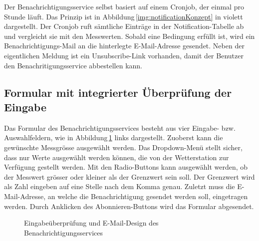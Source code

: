 \noindent
Der Benachrichtigungsservice selbst basiert auf einem Cronjob, der einmal pro Stunde läuft. Das Prinzip ist in Abbildung\,\ref{img:notificationKonzept} in violett dargestellt. Der Cronjob ruft sämtliche Einträge in der Notification-Tabelle ab und vergleicht sie mit den Messwerten. Sobald eine Bedingung erfüllt ist, wird ein Benachrichtigungs-Mail an die hinterlegte E-Mail-Adresse gesendet. Neben der eigentlichen Meldung ist ein Unsubscribe-Link vorhanden, damit der Benutzer den Benachritigungsservice abbestellen kann.

\subsection{Formular mit integrierter Überprüfung der Eingabe}
Das Formular des Benachrichtigungsservices besteht aus vier Eingabe- bzw. Auswahlfeldern, wie in Abbildung\,\ref{img:notificationFE} links dargestellt. Zuoberst kann die gewünschte Messgrösse ausgewählt werden. Das Dropdown-Menü stellt sicher, dass nur Werte ausgewählt werden können, die von der Wetterstation zur Verfügung gestellt werden. Mit den Radio-Buttons kann ausgewählt werden, ob der Messwert grösser oder kleiner als der Grenzwert sein soll. Der Grenzwert wird als Zahl eingeben auf eine Stelle nach dem Komma genau. Zuletzt muss die E-Mail-Adresse, an welche die Benachrichtigung gesendet werden soll, eingetragen werden. Durch Anklicken des Abonnieren-Buttons wird das Formular abgesendet.

\begin{figure}[htbp!]
	\centering
	\caption{Eingabeüberprüfung und E-Mail-Design des Benachrichtigungsservices}
	\label{img:notificationFE}
\end{figure}

